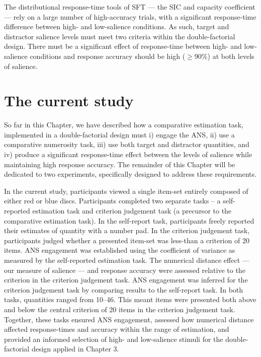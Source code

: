 The distributional response-time tools of SFT --- the SIC and capacity coefficient --- rely on a large number of high-accuracy trials, with a significant response-time difference between high- and low-salience conditions. As such, target and distractor salience levels must meet two criteria within the double-factorial design. There must be a significant effect of response-time between high- and low-salience conditions and response accuracy should be high (\ie $\geq$90\%) at both levels of salience. 

\section{The current study}
So far in this Chapter, we have described how a comparative estimation task, implemented in a double-factorial design must i) engage the ANS, ii) use a comparative numerosity task, iii) use both target and distractor quantities, and iv) produce a significant response-time effect between the levels of salience while maintaining high response accuracy. The remainder of this Chapter will be dedicated to two experiments, specifically designed to address these requirements. 

In the current study, participants viewed a single item-set entirely composed of either red or blue discs. Participants completed two separate tasks -- a self-reported estimation task and criterion judgement task (a precursor to the comparative estimation task). In the self-report task, participants freely reported their estimates of quantity with a number pad. In the criterion judgement task, participants judged whether a presented item-set was less-than a criterion of 20 items. ANS engagement was established using the coefficient of variance as measured by the self-reported estimation task. The numerical distance effect --- our measure of salience --- and response accuracy were assessed relative to the criterion in the criterion judgement task. ANS engagement was inferred for the criterion judgement task by comparing results to the self-report task. In both tasks, quantities ranged from 10--46. This meant items were presented both above and below the central criterion of 20 items in the criterion judgement task. Together, these tasks ensured ANS engagement, assessed how numerical distance affected response-times and accuracy within the range of estimation, and provided an informed selection of high- and low-salience stimuli for the double-factorial design applied in Chapter 3.

\color{black}

